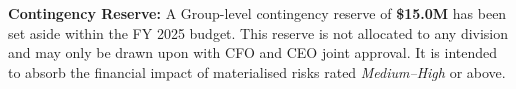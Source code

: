 \vspace{6pt}

\begin{tcolorbox}[
  enhanced,
  colback=NegativeRed!6,
  colframe=NegativeRed!60,
  boxrule=0.8pt,
  arc=4pt,
  left=10pt, right=10pt, top=6pt, bottom=6pt
]
{\small\bfseries\color{NegativeRed}\faExclamationTriangle\; Contingency Reserve:}
{\small\color{SlateGray} A Group-level contingency reserve of \textbf{\$15.0M} has been
set aside within the FY 2025 budget. This reserve is not allocated to any division
and may only be drawn upon with CFO and CEO joint approval. It is intended to absorb
the financial impact of materialised risks rated \textit{Medium--High} or above.}
\end{tcolorbox}
